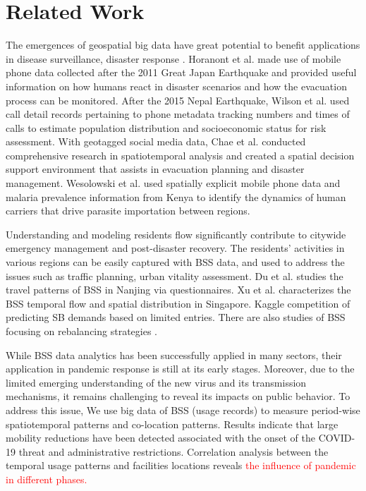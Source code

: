 \documentclass[preprints,ijgi,submit,moreauthors]{Definitions/mdpi}
\begin{document}
\section*{Related Work}
The emergences of geospatial big data have great potential to benefit applications in disease surveillance, disaster response \cite{Yu2018Big, Goodchild2010Crowdsourcing, Huang2015Predicating}.
Horanont et al. \cite{Horanont2013Auto} made use of mobile phone data collected after the 2011 Great Japan Earthquake and provided useful information on how humans react in disaster scenarios and how the evacuation process can be monitored.
After the 2015 Nepal Earthquake, Wilson et al. \cite{Wilson2016Rapid} used call detail records pertaining to phone metadata tracking numbers and times of calls to estimate population distribution and socioeconomic status for risk assessment.
With geotagged social media data, Chae et al. \cite{CHAE2013Public} conducted comprehensive research in spatiotemporal analysis and created a spatial decision support environment that assists in evacuation planning and disaster management.
Wesolowski et al. \cite{Wesolowski2012Quantifying}  used spatially explicit mobile phone data and malaria prevalence information from Kenya to identify the dynamics of human carriers that drive parasite importation between regions. 

Understanding and modeling residents flow significantly contribute to citywide emergency management and post-disaster recovery.
The residents' activities in various regions can be easily captured with BSS data, and used to address the issues such as traffic planning, urban vitality assessment.
Du et al. \cite{du2018better} studies the travel patterns of BSS in Nanjing via questionnaires.
Xu et al. \cite{xu2019unravel} characterizes the BSS temporal flow and spatial distribution in Singapore.
Kaggle \cite{kaggle} competition of predicting SB demands based on limited entries.
There are also studies of BSS focusing on rebalancing strategies \cite{pal2017free, ai2019deep}.

While BSS data analytics has been successfully applied in many sectors, their application in pandemic response is still at its early stages.
Moreover, due to the limited emerging understanding of the new virus and its transmission mechanisms, it remains challenging to reveal its impacts on public behavior.
To address this issue, We use big data of BSS (usage records) to measure period-wise spatiotemporal patterns and co-location patterns. 
Results indicate that large mobility reductions have been detected associated with the onset of the COVID-19 threat and administrative restrictions.
Correlation analysis between the temporal usage patterns and facilities locations reveals \textcolor{red}{the influence of pandemic in different phases.} 
\end{document}
